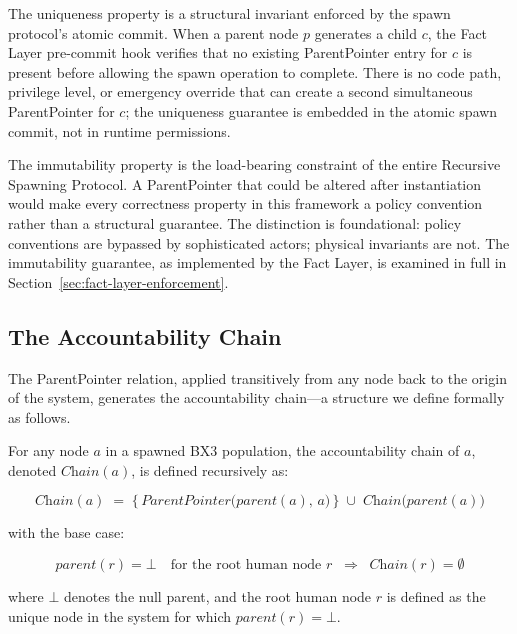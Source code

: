 The uniqueness property is a structural invariant enforced by the spawn protocol's atomic commit. When a parent node $p$ generates a child $c$, the Fact Layer pre-commit hook verifies that no existing ParentPointer entry for $c$ is present before allowing the spawn operation to complete. There is no code path, privilege level, or emergency override that can create a second simultaneous ParentPointer for $c$; the uniqueness guarantee is embedded in the atomic spawn commit, not in runtime permissions.

The immutability property is the load-bearing constraint of the entire Recursive Spawning Protocol. A ParentPointer that could be altered after instantiation would make every correctness property in this framework a policy convention rather than a structural guarantee. The distinction is foundational: policy conventions are bypassed by sophisticated actors; physical invariants are not. The immutability guarantee, as implemented by the Fact Layer, is examined in full in Section~\ref{sec:fact-layer-enforcement}.

\subsection{The Accountability Chain}

The ParentPointer relation, applied transitively from any node back to the origin of the system, generates the accountability chain—a structure we define formally as follows.

\begin{definition}
\label{def:chain}
For any node $a$ in a spawned BX3 population, the accountability chain of $a$, denoted $\textit{Chain}(a)$, is defined recursively as:

\begin{equation}
\label{eq:chain-recursion}
\textit{Chain}(a) \;=\; \bigl\{\, \textit{ParentPointer}\bigl(\textit{parent}(a),\, a\bigr) \,\bigr\} \;\cup\; \textit{Chain}\bigl(\textit{parent}(a)\bigr)
\end{equation}

\noindent with the base case:

\begin{equation}
\label{eq:chain-base}
\textit{parent}(r) = \bot \quad\text{for the root human node } r \;\;\Longrightarrow\;\; \textit{Chain}(r) = \emptyset
\end{equation}

\noindent where $\bot$ denotes the null parent, and the root human node $r$ is defined as the unique node in the system for which $\textit{parent}(r) = \bot$.
\end{definition}

